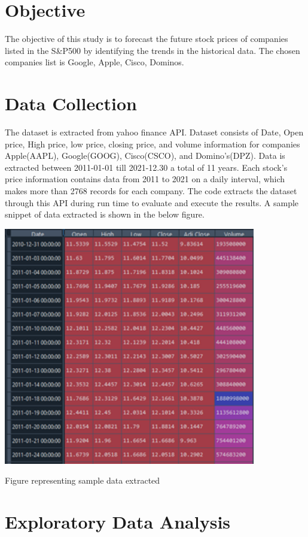 \section{Objective}

The objective of this study is to forecast the future stock prices of companies listed in the S&P500 by identifying the trends in the historical data. The chosen companies list is Google, Apple, Cisco, Dominos.

\section{Data Collection}

The dataset is extracted from yahoo finance API. Dataset consists of Date, Open price, High price, low price, closing price, and volume information for companies Apple(AAPL), Google(GOOG), Cisco(CSCO), and Domino's(DPZ). Data is extracted between 2011-01-01 till 2021-12.30 a total of 11 years. Each stock's price information contains data from 2011 to 2021 on a daily interval, which makes more than 2768 records for each company. The code extracts the dataset through this API during run time to evaluate and execute the results. A sample snippet of data extracted is shown in the below figure.

\begin{center}
    \includegraphics[width=11cm]{data_extraction.png}
    \caption{ Figure representing sample data extracted}
\end{center}

\section{Exploratory Data Analysis}

